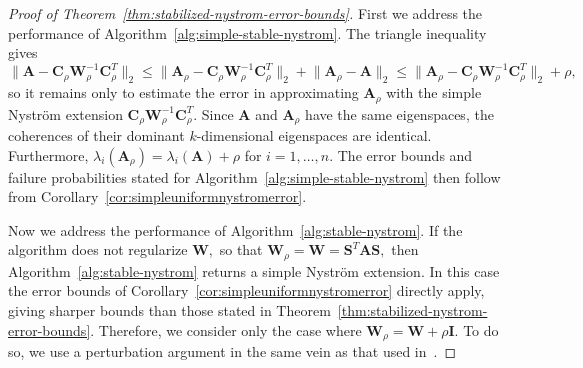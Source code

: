 \documentclass[11pt,letterpaper,twoside,reqno,nosumlimits]{amsart}
\def\transp{T}
\newcommand{\mat}[1]{\ensuremath{\mathbf{#1}}}
\newcommand{\snorm}[1]{\ensuremath{\big\|#1\big\|_2}}
\theoremstyle{remark}
\begin{document}
\begin{proof}[Proof of Theorem~\ref{thm:stabilized-nystrom-error-bounds}]
First we address the performance of Algorithm~\ref{alg:simple-stable-nystrom}. The triangle inequality gives
\[
  \snorm{\mat{A} - \mat{C}_\rho\mat{W}_\rho^{-1} \mat{C}_\rho^\transp } \leq \snorm{\mat{A}_\rho - \mat{C}_\rho\mat{W}_\rho^{-1} \mat{C}_\rho^\transp} + \snorm{\mat{A}_\rho - \mat{A}}
   \leq \snorm{\mat{A}_\rho - \mat{C}_\rho\mat{W}_\rho^{-1} \mat{C}_\rho^\transp} + \rho,
\]
so it remains only to estimate the error in approximating $\mat{A}_\rho$ with the simple Nystr\"om extension $\mat{C}_\rho\mat{W}_\rho^{-1} \mat{C}_\rho^\transp.$
Since $\mat{A}$ and $\mat{A}_\rho$ have the same eigenspaces, the coherences of their dominant $k$-dimensional eigenspaces are identical. Furthermore, $\lambda_i(\mat{A}_\rho) = \lambda_i(\mat{A}) + \rho$ for $i=1,\ldots,n.$ The error bounds and failure probabilities stated for Algorithm~\ref{alg:simple-stable-nystrom} then follow from Corollary~\ref{cor:simpleuniformnystromerror}.
 
 Now we address the performance of Algorithm~\ref{alg:stable-nystrom}. If the algorithm does not regularize $\mat{W},$ so that $\mat{W}_\rho = \mat{W} = \mat{S}^\transp \mat{A} \mat{S},$ then Algorithm~\ref{alg:stable-nystrom} returns a simple Nystr\"om extension. In this case the error bounds of Corollary~\ref{cor:simpleuniformnystromerror} directly apply, giving sharper bounds than those stated in Theorem~\ref{thm:stabilized-nystrom-error-bounds}. Therefore, we consider only the case where $\mat{W}_\rho = \mat{W} + \rho \mat{I}.$ To do so, we use a perturbation argument in the same vein as that used in~\cite{CD11}. 


\end{proof}
\end{document}
